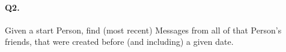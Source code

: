 \paragraph{Q2.}

Given a start Person, find (most recent) Messages from all of that
Person's friends, that were created before (and including) a given date.
